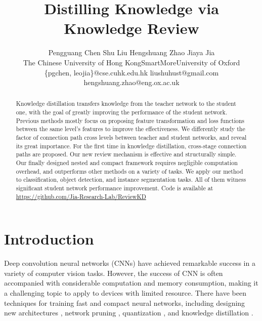 \documentclass[final]{cvpr}
\begin{document}
\title{Distilling Knowledge via Knowledge Review}

\author{Pengguang Chen \quad Shu Liu \quad Hengshuang Zhao \quad Jiaya Jia  \\
	The Chinese University of Hong Kong\quad SmartMore\quad University of Oxford\\
	\{pgchen, leojia\}@cse.cuhk.edu.hk \quad liushuhust@gmail.com \quad hengshuang.zhao@eng.ox.ac.uk
}


\maketitle
\pagestyle{empty}
\thispagestyle{empty}


\begin{abstract}
Knowledge distillation transfers knowledge from the teacher network to the student one, with the goal of greatly improving the performance of the student network. Previous methods mostly focus on proposing feature transformation and loss functions between the same level's features to improve the effectiveness. We differently study the factor of connection path cross levels between teacher and student networks, and reveal its great importance. For the first time in knowledge distillation, cross-stage connection paths are proposed. Our new review mechanism is effective and structurally simple. Our finally designed nested and compact framework requires negligible computation overhead, and outperforms other methods on a variety of tasks. We apply our method to classification, object detection, and instance segmentation tasks. All of them witness significant student network performance improvement. Code is available at \url{https://github.com/Jia-Research-Lab/ReviewKD}
\end{abstract}

\section{Introduction}
Deep convolution neural networks (CNNs) have achieved remarkable success in a variety of computer vision tasks. However, the success of CNN is often accompanied with considerable computation and memory consumption, making it a challenging topic to apply to devices with limited resource. 
There have been techniques for training fast and compact neural networks, including designing new architectures \cite{mobilev3,fpnas,mobilenet,mobilev2}, network pruning \cite{thinet,prunning,autoprune,lottery,rethinkprune}, quantization \cite{quantization} , and knowledge distillation \cite{kd,fitnet}. 
\end{document}
